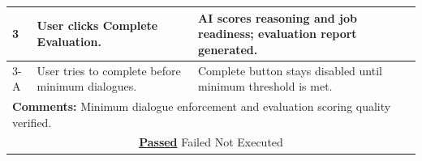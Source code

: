 \documentclass{FastFyp}
\begin{document}
\begin{table}[H]
\begin{tabular}{|p{2.5cm}|p{4cm}|p{2.5cm}|p{4.5cm}|}
3 & User clicks Complete Evaluation. & \multicolumn{2}{p{7cm}|}{AI scores reasoning and job readiness; evaluation report generated.} \\ \hline
3-A & User tries to complete before minimum dialogues. & \multicolumn{2}{p{7cm}|}{Complete button stays disabled until minimum threshold is met.} \\ \hline
\multicolumn{4}{|p{13.5cm}|}{\textbf{Comments:} Minimum dialogue enforcement and evaluation scoring quality verified.} \\ \hline
\multicolumn{4}{|c|}{\underline{\textbf{Passed}} \quad\quad\quad Failed \quad\quad\quad Not Executed} \\ \hline
\end{tabular}
\end{table}

\vspace{0.5em}
\end{document}
